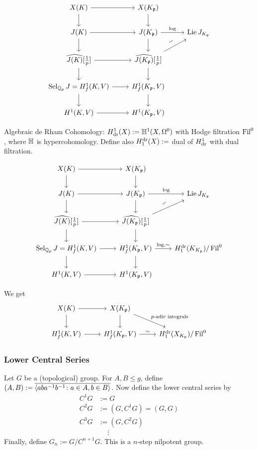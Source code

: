 	\[
	\begin{tikzcd}
	X(K) \arrow{d} \arrow{r} & X(K_\p) \arrow{d} \\
	J(K) \arrow{r} \arrow{d} & J(K_\p) \arrow{r}{\log} \arrow{d} & \lie J_{K_\p} \\
	\widehat{J(K)}[\frac{1}{p}] \arrow{r} \arrow{d} & \widehat{J(K_\p)}[\frac{1}{p}] \arrow{ur}{\rotatebox{45}{$\sim$}} \arrow{d} \\
	\sel_{\Q_p} J \arrow{d}= H_f^1(K,V) \arrow{r} &  H_f^1(K_\p,V) \arrow{d} \\
	H^1(K,V) \arrow{r} & H^1(K_\p,V)
	\end{tikzcd}
	\]


Algebraic de Rham Cohomology: $H_{\text{dr}}^1(X):= \mathbb{H}^1(X,\Omega^0)$ with Hodge filtration $\operatorname{Fil}^0$, where $\mathbb{H}$ is hypercohomology. Define also $H_1^{\text{dr}}(X):=$ dual of $H_{\text{dr}}^1$ with dual filtration. 


	\[
	\begin{tikzcd}
	X(K) \arrow{d} \arrow{r} & X(K_\p) \arrow{d} \\
	J(K) \arrow{r} \arrow{d} & J(K_\p) \arrow{r}{\log} \arrow{d} & \lie J_{K_\p} \\
	\widehat{J(K)}[\frac{1}{p}] \arrow{r} \arrow{d} & \widehat{J(K_\p)}[\frac{1}{p}] \arrow{ur}{\rotatebox{45}{$\sim$}} \arrow{d} \\
	\sel_{\Q_p} J \arrow{d}= H_f^1(K,V) \arrow{r} &  H_f^1(K_\p,V) \arrow{d} \arrow{r}{\log, \sim} &  H_1^\dr(K_{K_\p})/\Fil^0 \\
	H^1(K,V) \arrow{r} & H^1(K_\p,V)
	\end{tikzcd}
	\]


We get 
	\[
	\begin{tikzcd}
	X(K) \arrow{r} \arrow{d} & X(K_\p) \arrow{d} \arrow{dr}{p\text{-adic integrals}} \\
	H_f^1(K,V) \arrow{r} &  H_f^1(K_\p,V) \arrow{r}{\sim} & H_1^\dr(X_{K_\p})/\Fil^0
	\end{tikzcd}
	\]



\subsubsection{Lower Central Series}

Let $G$ be a (topological) group. For $A, B \leq g$, define $(A,B):= \overline{\langle aba^{-1}b^{-1} \colon a \in A, b \in B \rangle}$. Now define the lower central series by
	\[
	\begin{aligned}
	C^1G&:= G \\
	C^2G&:= (G,C^1G)= (G,G) \\
	C^3G&:= (G,C^2G) \\
	&\phantom{=}\vdots
	\end{aligned}
	\]
Finally, define $G_n:= G/C^{n+1}G$. This is a $n$-step nilpotent group. 


